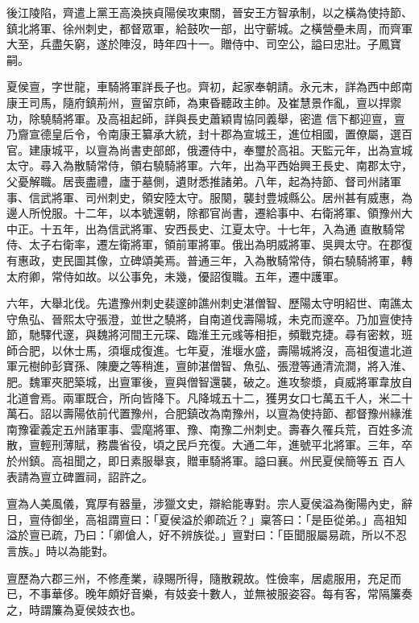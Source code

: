 \begin{pinyinscope}
 後江陵陷，齊遣上黨王高渙挾貞陽侯攻東關，晉安王方智承制，以之橫為使持節、鎮北將軍、徐州刺史，都督眾軍，給鼓吹一部，出守蘄城。之橫營壘未周，而齊軍大至，兵盡矢窮，遂於陣沒，時年四十一。贈侍中、司空公，謚曰忠壯。子鳳寶嗣。



 夏侯亶，字世龍，車騎將軍詳長子也。齊初，起家奉朝請。永元末，詳為西中郎南康王司馬，隨府鎮荊州，亶留京師，為東昏聽政主帥。及崔慧景作亂，亶以捍禦功，除驍騎將軍。及高祖起師，詳與長史蕭穎胄協同義舉，密遣
 信下都迎亶，亶乃齎宣德皇后令，令南康王纂承大統，封十郡為宣城王，進位相國，置僚屬，選百官。建康城平，以亶為尚書吏部郎，俄遷侍中，奉璽於高祖。天監元年，出為宣城太守。尋入為散騎常侍，領右驍騎將軍。六年，出為平西始興王長史、南郡太守，父憂解職。居喪盡禮，廬于墓側，遺財悉推諸弟。八年，起為持節、督司州諸軍事、信武將軍、司州刺史，領安陸太守。服闋，襲封豊城縣公。居州甚有威惠，為邊人所悅服。十二年，以本號還朝，除都官尚書，遷給事中、右衛將軍、領豫州大中正。十五年，出為信武將軍、安西長史、江夏太守。十七年，入為通
 直散騎常侍、太子右衛率，遷左衛將軍，領前軍將軍。俄出為明威將軍、吳興太守。在郡復有惠政，吏民圖其像，立碑頌美焉。普通三年，入為散騎常侍，領右驍騎將軍，轉太府卿，常侍如故。以公事免，未幾，優詔復職。五年，遷中護軍。



 六年，大舉北伐。先遣豫州刺史裴邃帥譙州刺史湛僧智、歷陽太守明紹世、南譙太守魚弘、晉熙太守張澄，並世之驍將，自南道伐壽陽城，未克而邃卒。乃加亶使持節，馳驛代邃，與魏將河間王元琛、臨淮王元彧等相拒，頻戰克捷。尋有密敕，班師合肥，以休士馬，須堰成復進。七年夏，淮堰水盛，壽陽城將沒，高祖復遣北道
 軍元樹帥彭寶孫、陳慶之等稍進，亶帥湛僧智、魚弘、張澄等通清流澗，將入淮、肥。魏軍夾肥築城，出亶軍後，亶與僧智還襲，破之。進攻黎漿，貞威將軍韋放自北道會焉。兩軍既合，所向皆降下。凡降城五十二，獲男女口七萬五千人，米二十萬石。詔以壽陽依前代置豫州，合肥鎮改為南豫州，以亶為使持節、都督豫州緣淮南豫霍義定五州諸軍事、雲麾將軍、豫、南豫二州刺史。壽春久罹兵荒，百姓多流散，亶輕刑薄賦，務農省役，頃之民戶充復。大通二年，進號平北將軍。三年，卒於州鎮。高祖聞之，即日素服舉哀，贈車騎將軍。謚曰襄。州民夏侯簡等五
 百人表請為亶立碑置祠，詔許之。



 亶為人美風儀，寬厚有器量，涉獵文史，辯給能專對。宗人夏侯溢為衡陽內史，辭日，亶侍御坐，高祖謂亶曰：「夏侯溢於卿疏近？」稟答曰：「是臣從弟。」高祖知溢於亶已疏，乃曰：「卿傖人，好不辨族從。」亶對曰：「臣聞服屬易疏，所以不忍言族。」時以為能對。



 亶歷為六郡三州，不修產業，祿賜所得，隨散親故。性儉率，居處服用，充足而已，不事華侈。晚年頗好音樂，有妓妾十數人，並無被服姿容。每有客，常隔簾奏之，時謂簾為夏侯妓衣也。




\end{pinyinscope}
